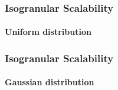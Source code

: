 \begin{frame}
\frametitle{Isogranular Scalability}
\framesubtitle{Uniform distribution}
\begin{figure} 
	\centering
	
\end{figure}
\end{frame}

\begin{frame}
\frametitle{Isogranular Scalability}
\framesubtitle{Gaussian distribution}
\begin{figure} 
	\centering
	
\end{figure}
\end{frame}

